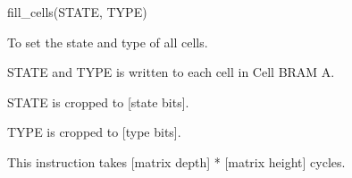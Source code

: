 

\format
fill\_cells(STATE, TYPE)

\purpose

To set the state and type of all cells.

\description

STATE and TYPE is written to each cell in Cell BRAM A.

\notes

STATE is cropped to [state bits].

TYPE is cropped to [type bits].

This instruction takes [matrix depth] * [matrix height] cycles.
